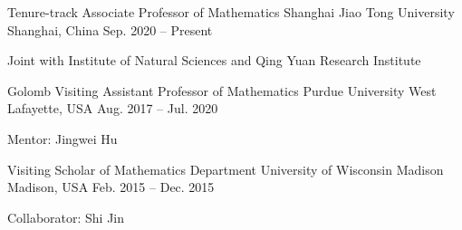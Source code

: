 

\begin{cventries}

  \cventry
    {Tenure-track Associate Professor of Mathematics} %
    {Shanghai Jiao Tong University} %
    {Shanghai, China} %
    {Sep. 2020 -- Present} %
    {
      \begin{cvitems} %
        \item {Joint with Institute of Natural Sciences and Qing Yuan Research Institute}
      \end{cvitems}
    }


  \cventry
    {Golomb Visiting Assistant Professor of Mathematics} %
    {Purdue University} %
    {West Lafayette, USA} %
    {Aug. 2017 -- Jul. 2020} %
    {
      \begin{cvitems} %
        \item {Mentor: Jingwei Hu}
      \end{cvitems}
    }

  \cventry
    {Visiting Scholar of Mathematics Department} %
    {University of Wisconsin Madison} %
    {Madison, USA} %
    {Feb. 2015 -- Dec. 2015} %
    {
      \begin{cvitems} %
        \item {Collaborator: Shi Jin}
      \end{cvitems}
    }

\end{cventries}
